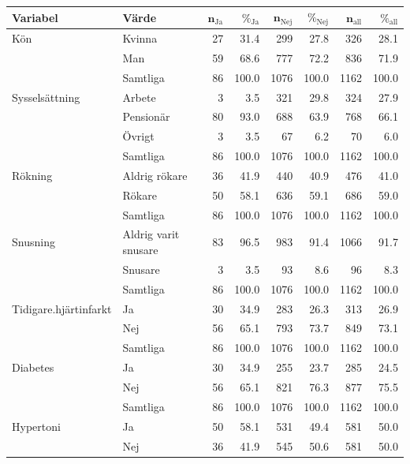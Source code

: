 \begin{table}[htbp]
\centering
\caption{}
\label{}
{\footnotesize
\begin{tabular}{ll|rr|rr|rr}
 \textbf{Variabel} & \textbf{Värde} & $\mathbf{n_{\mathrm{Ja}}}$ & $\mathbf{\%_{\mathrm{Ja}}}$ & $\mathbf{n_{\mathrm{Nej}}}$ & $\mathbf{\%_{\mathrm{Nej}}}$ & $\mathbf{n_{\mathrm{all}}}$ & $\mathbf{\%_{\mathrm{all}}}$ \\ 
  \hline
Kön & Kvinna & 27 & 31.4 & 299 & 27.8 & 326 & 28.1 \\ 
   & Man & 59 & 68.6 & 777 & 72.2 & 836 & 71.9 \\ 
   \hline
 & Samtliga & 86 & 100.0 & 1076 & 100.0 & 1162 & 100.0 \\ 
   \hline
\hline
Sysselsättning & Arbete & 3 & 3.5 & 321 & 29.8 & 324 & 27.9 \\ 
   & Pensionär & 80 & 93.0 & 688 & 63.9 & 768 & 66.1 \\ 
   & Övrigt & 3 & 3.5 & 67 & 6.2 & 70 & 6.0 \\ 
   \hline
 & Samtliga & 86 & 100.0 & 1076 & 100.0 & 1162 & 100.0 \\ 
   \hline
\hline
Rökning & Aldrig rökare & 36 & 41.9 & 440 & 40.9 & 476 & 41.0 \\ 
   & Rökare & 50 & 58.1 & 636 & 59.1 & 686 & 59.0 \\ 
   \hline
 & Samtliga & 86 & 100.0 & 1076 & 100.0 & 1162 & 100.0 \\ 
   \hline
\hline
Snusning & Aldrig varit snusare & 83 & 96.5 & 983 & 91.4 & 1066 & 91.7 \\ 
   & Snusare & 3 & 3.5 & 93 & 8.6 & 96 & 8.3 \\ 
   \hline
 & Samtliga & 86 & 100.0 & 1076 & 100.0 & 1162 & 100.0 \\ 
   \hline
\hline
Tidigare.hjärtinfarkt & Ja & 30 & 34.9 & 283 & 26.3 & 313 & 26.9 \\ 
   & Nej & 56 & 65.1 & 793 & 73.7 & 849 & 73.1 \\ 
   \hline
 & Samtliga & 86 & 100.0 & 1076 & 100.0 & 1162 & 100.0 \\ 
   \hline
\hline
Diabetes & Ja & 30 & 34.9 & 255 & 23.7 & 285 & 24.5 \\ 
   & Nej & 56 & 65.1 & 821 & 76.3 & 877 & 75.5 \\ 
   \hline
 & Samtliga & 86 & 100.0 & 1076 & 100.0 & 1162 & 100.0 \\ 
   \hline
\hline
Hypertoni & Ja & 50 & 58.1 & 531 & 49.4 & 581 & 50.0 \\ 
   & Nej & 36 & 41.9 & 545 & 50.6 & 581 & 50.0 \\ 

\end{tabular}}
\end{table}
